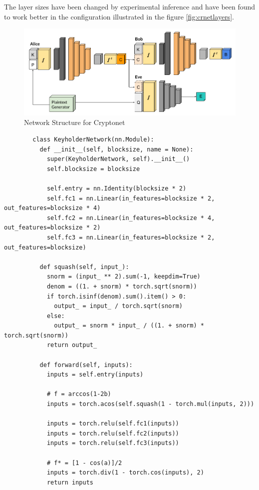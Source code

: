 \documentclass[a4paper]{article}
\begin{document}
      The layer sizes have been changed by experimental inference and have been found to work better in
      the configuration illustrated in the figure \ref{fig:crnetlayers}.

      \begin{figure}[H]
        \centering
        \includegraphics[width=\textwidth]{../ref/crnetstruct.png}
        \caption{Network Structure for Cryptonet}
        \label{fig:crnetstruct}
      \end{figure}

      \begin{lstlisting}
        class KeyholderNetwork(nn.Module):
          def __init__(self, blocksize, name = None):
            super(KeyholderNetwork, self).__init__()
            self.blocksize = blocksize

            self.entry = nn.Identity(blocksize * 2)
            self.fc1 = nn.Linear(in_features=blocksize * 2, out_features=blocksize * 4)
            self.fc2 = nn.Linear(in_features=blocksize * 4, out_features=blocksize * 2)
            self.fc3 = nn.Linear(in_features=blocksize * 2, out_features=blocksize)

          def squash(self, input_):
            snorm = (input_ ** 2).sum(-1, keepdim=True)
            denom = ((1. + snorm) * torch.sqrt(snorm))
            if torch.isinf(denom).sum().item() > 0:
              output_ = input_ / torch.sqrt(snorm)
            else:
              output_ = snorm * input_ / ((1. + snorm) * torch.sqrt(snorm))
            return output_
        
          def forward(self, inputs):    
            inputs = self.entry(inputs)
        
            # f = arccos(1-2b)
            inputs = torch.acos(self.squash(1 - torch.mul(inputs, 2)))

            inputs = torch.relu(self.fc1(inputs))
            inputs = torch.relu(self.fc2(inputs))
            inputs = torch.relu(self.fc3(inputs))
        
            # f* = [1 - cos(a)]/2
            inputs = torch.div(1 - torch.cos(inputs), 2)       
            return inputs
      \end{lstlisting}
\end{document}
